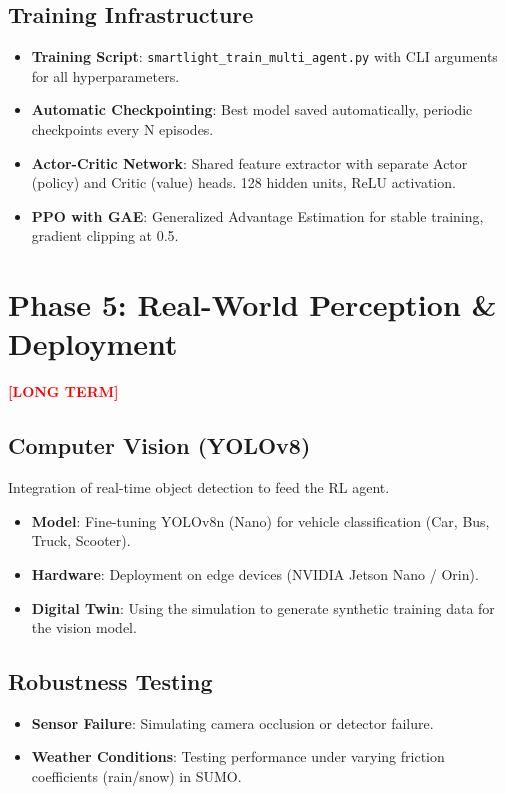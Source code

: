 \documentclass[a4paper,11pt]{article}
\begin{document}
\subsection{Training Infrastructure}
\begin{itemize}
    \item \textbf{Training Script}: \texttt{smartlight\_train\_multi\_agent.py} with CLI arguments for all hyperparameters.
    \item \textbf{Automatic Checkpointing}: Best model saved automatically, periodic checkpoints every N episodes.
    \item \textbf{Actor-Critic Network}: Shared feature extractor with separate Actor (policy) and Critic (value) heads. 128 hidden units, ReLU activation.
    \item \textbf{PPO with GAE}: Generalized Advantage Estimation for stable training, gradient clipping at 0.5.
\end{itemize}

\section{Phase 5: Real-World Perception \& Deployment}
\textcolor{red}{\textbf{[LONG TERM]}}

\subsection{Computer Vision (YOLOv8)}
Integration of real-time object detection to feed the RL agent.
\begin{itemize}
    \item \textbf{Model}: Fine-tuning YOLOv8n (Nano) for vehicle classification (Car, Bus, Truck, Scooter).
    \item \textbf{Hardware}: Deployment on edge devices (NVIDIA Jetson Nano / Orin).
    \item \textbf{Digital Twin}: Using the simulation to generate synthetic training data for the vision model.
\end{itemize}

\subsection{Robustness Testing}
\begin{itemize}
    \item \textbf{Sensor Failure}: Simulating camera occlusion or detector failure.
    \item \textbf{Weather Conditions}: Testing performance under varying friction coefficients (rain/snow) in SUMO.
\end{itemize}
\end{document}
